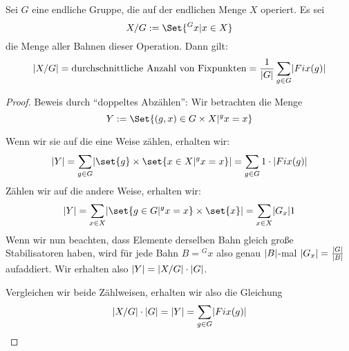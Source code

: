 \begin{theorem}
Sei $G$ eine endliche Gruppe, die auf der endlichen Menge $X$ operiert. Es sei
\[X/G := \Set{{^G x} | x\in X}\]
die Menge aller Bahnen dieser Operation. Dann gilt:
\[\lvert X/G\rvert = \text{durchschnittliche Anzahl von Fixpunkten} = \frac{1}{\lvert G\rvert} \sum_{g\in G} \lvert Fix(g)\rvert\]
\end{theorem}
\begin{proof}
Beweis durch \enquote{doppeltes Abzählen}: Wir betrachten die Menge
\[Y:=\Set{(g,x)\in G\times X | {^g x} =x}\]

Wenn wir sie auf die eine Weise zählen, erhalten wir:
\[\abs{Y} = \sum_{g\in G} \abs{\set{g}\times\set{x\in X | {^g x}=x}} = \sum_{g\in G} 1\cdot\abs{Fix(g)}\]
Zählen wir auf die andere Weise, erhalten wir:
\[\abs{Y} = \sum_{x\in X} \abs{\set{g\in G | {^g x}=x}\times\set{x}} = \sum_{x\in X} \abs{G_x}1 \]
Wenn wir nun beachten, dass Elemente derselben Bahn gleich große Stabilisatoren haben, wird für jede Bahn $B={^G x}$ also genau $\lvert B\rvert$-mal $\lvert G_x\rvert=\frac{\lvert G\rvert}{\lvert B\rvert}$ aufaddiert. Wir erhalten also $\lvert Y\rvert = \lvert X/G\rvert\cdot \lvert G\rvert$.

Vergleichen wir beide Zählweisen, erhalten wir also die Gleichung
\[\lvert X/G\rvert \cdot\lvert G\rvert = \lvert Y\rvert = \sum_{g\in G} \lvert Fix(g)\rvert \qedhere\]
\end{proof}